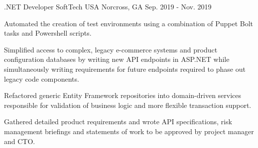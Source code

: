 

\begin{cventries}

  \cventry
    {.NET Developer} %
    {SoftTech USA} %
    {Norcross, GA} %
    {Sep. 2019 - Nov. 2019} %
    {
      \begin{cvitems} %
        \item {Automated the creation of test environments using a combination of Puppet Bolt tasks and Powershell scripts.}
        \item {Simplified access to complex, legacy e-commerce systems and product configuration databases by writing new API endpoints in ASP.NET while simultaneously writing requirements for future endpoints required to phase out legacy code components. }
        \item {Refactored generic Entity Framework repositories into domain-driven services responsible for validation of business logic and more flexible transaction support.}
        \item {Gathered detailed product requirements and wrote API specifications, risk management briefings and statements of work to be approved by project manager and CTO.}
      \end{cvitems}
    }


\end{cventries}
